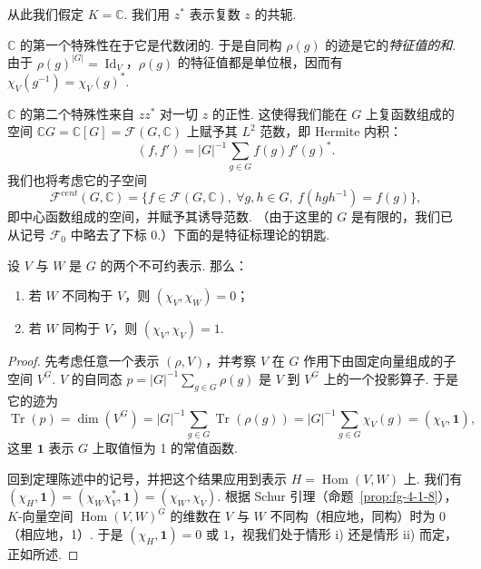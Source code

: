\begin{numpara}[复的情形]\label{np:fg-4-2-6}
从此我们假定 $K=\mathbb{C}$. 我们用 $z^*$ 表示复数 $z$ 的共轭.

$\mathbb{C}$ 的第一个特殊性在于它是代数闭的. 于是自同构 $\rho(g)$ 的迹是它的\emph{特征值的和}. 由于 $\rho(g)^{|G|}=\operatorname{Id}_V$，$\rho(g)$ 的特征值都是单位根，因而有 $\chi_V(g^{-1})=\chi_V(g)^*$.

$\mathbb{C}$ 的第二个特殊性来自 $zz^*$ 对一切 $z$ 的正性. 这使得我们能在 $G$ 上复函数组成的空间 $\mathbb{C}G=\mathbb{C}[G]=\mathcal{F}(G,\mathbb{C})$ 上赋予其 $L^2$ 范数，即 Hermite 内积：
\[
(f,f')=|G|^{-1}\sum_{g\in G}f(g)f'(g)^*.
\]
我们也将考虑它的子空间
\[
\mathcal{F}^{cent}(G,\mathbb{C})=\{f\in\mathcal{F}(G,\mathbb{C}),\ \forall g,h\in G,\ f(hgh^{-1})=f(g)\},
\]
即中心函数组成的空间，并赋予其诱导范数. （由于这里的 $G$ 是有限的，我们已从记号 $\mathcal{F}_0$ 中略去了下标 0.）下面的是特征标理论的钥匙.
\end{numpara}

\begin{theorem}\label{thm:fg-4-2-7}
设 $V$ 与 $W$ 是 $G$ 的两个不可约表示. 那么：
\begin{enumerate}[label=\roman*)]
\item 若 $W$ 不同构于 $V$，则 $(\chi_V,\chi_W)=0$；
\item 若 $W$ 同构于 $V$，则 $(\chi_V,\chi_V)=1$.
\end{enumerate}
\end{theorem}

\begin{proof}
先考虑任意一个表示 $(\rho,V)$，并考察 $V$ 在 $G$ 作用下由固定向量组成的子空间 $V^G$. $V$ 的自同态 $p=|G|^{-1}\sum_{g\in G}\rho(g)$ 是 $V$ 到 $V^G$ 上的一个投影算子. 于是它的迹为
\[
\operatorname{Tr}(p)=\dim(V^G)=|G|^{-1}\sum_{g\in G}\operatorname{Tr}(\rho(g))=|G|^{-1}\sum_{g\in G}\chi_V(g)=(\chi_V,\mathbf{1}),
\]
这里 $\mathbf{1}$ 表示 $G$ 上取值恒为 1 的常值函数.

回到定理陈述中的记号，并把这个结果应用到表示 $H=\operatorname{Hom}(V,W)$ 上. 我们有 $(\chi_H,\mathbf{1})=(\chi_W\chi_V^*,\mathbf{1})=(\chi_W,\chi_V)$. 根据 Schur 引理（命题~\ref{prop:fg-4-1-8}），$K$-向量空间 $\operatorname{Hom}(V,W)^G$ 的维数在 $V$ 与 $W$ 不同构（相应地，同构）时为 0（相应地，1）. 于是 $(\chi_H,\mathbf{1})=0$ 或 $1$，视我们处于情形 i) 还是情形 ii) 而定，正如所述.
\end{proof}


